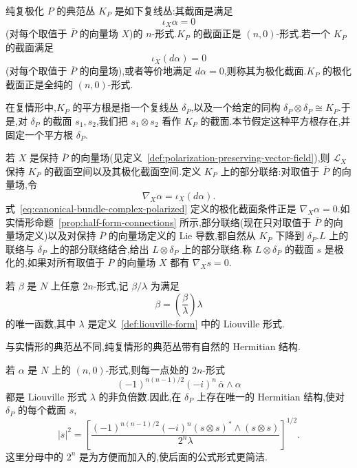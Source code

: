 纯复极化 $P$ 的典范丛 $K_P$ 是如下复线丛:其截面是满足
\[
 \iota_X\alpha=0
 \label{eq:canonical-bundle-complex-annihilation}
\]
(对每个取值于 $\overline P$ 的向量场 $X$)的 $n$-形式.$K_P$ 的截面正是 $(n,0)$-形式.若一个 $K_P$ 的截面满足
\[
 \iota_X(d\alpha)=0
 \label{eq:canonical-bundle-complex-polarized}
\]
(对每个取值于 $\overline P$ 的向量场),或者等价地满足 $d\alpha=0$,则称其为极化截面.$K_P$ 的极化截面正是全纯的 $(n,0)$-形式.

在复情形中,$K_P$ 的平方根是指一个复线丛 $\delta_P$,以及一个给定的同构 $\delta_P\otimes\delta_P\cong K_P$.于是,对 $\delta_P$ 的截面 $s_1,s_2$,我们把 $s_1\otimes s_2$ 看作 $K_P$ 的截面.本节假定这种平方根存在,并固定一个平方根 $\delta_P$.

若 $X$ 是保持 $\overline P$ 的向量场(见定义~\ref{def:polarization-preserving-vector-field}),则 $\mathcal L_X$ 保持 $K_P$ 的截面空间以及其极化截面空间.定义 $K_P$ 上的部分联络:对取值于 $\overline P$ 的向量场,令
\[
 \nabla_X\alpha=\iota_X(d\alpha).
\]
式~\eqref{eq:canonical-bundle-complex-polarized} 定义的极化截面条件正是 $\nabla_X\alpha=0$.如实情形命题~\ref{prop:half-form-connections} 所示,部分联络(现在只对取值于 $\overline P$ 的向量场定义)以及对保持 $\overline P$ 的向量场定义的 Lie 导数,都自然从 $K_P$ 下降到 $\delta_P$.$L$ 上的联络与 $\delta_P$ 上的部分联络结合,给出 $L\otimes\delta_P$ 上的部分联络.称 $L\otimes\delta_P$ 的截面 $s$ 是极化的,如果对所有取值于 $\overline P$ 的向量场 $X$ 都有 $\nabla_Xs=0$.

\begin{note}
\label{note:top-form-density-ratio}
若 $\beta$ 是 $N$ 上任意 $2n$-形式,记 $\beta/\lambda$ 为满足
\[
 \beta=\left(\frac{\beta}{\lambda}\right)\lambda
\]
的唯一函数,其中 $\lambda$ 是定义~\ref{def:liouville-form} 中的 Liouville 形式.
\end{note}

与实情形的典范丛不同,纯复情形的典范丛带有自然的 Hermitian 结构.

\begin{proposition}
\label{prop:complex-canonical-hermitian-structure}
若 $\alpha$ 是 $N$ 上的 $(n,0)$-形式,则每一点处的 $2n$-形式
\[
 (-1)^{n(n-1)/2}(-i)^n\,\overline\alpha\wedge\alpha
\]
都是 Liouville 形式 $\lambda$ 的非负倍数.因此,在 $\delta_P$ 上存在唯一的 Hermitian 结构,使对 $\delta_P$ 的每个截面 $s$,
\[
 |s|^2=\left[
 \frac{(-1)^{n(n-1)/2}(-i)^n
 (s\otimes s)^*\wedge(s\otimes s)}{2^n\lambda}
 \right]^{1/2}.
 \label{eq:complex-half-form-hermitian-structure}
\]
这里分母中的 $2^n$ 是为方便而加入的,使后面的公式形式更简洁.
\end{proposition}

